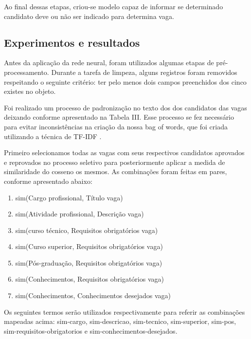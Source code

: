 \documentclass[conference]{IEEEtran}
\begin{document}
Ao final dessas etapas, criou-se modelo capaz de informar se determinado candidato deve ou não ser indicado para determina vaga.

\subsection{Experimentos e resultados}

    Antes da aplicação da rede neural, foram utilizados algumas etapas de pré-processamento. 
    Durante a tarefa de limpeza, alguns registros foram removidos respeitando o seguinte critério: ter pelo menos dois campos preenchidos dos cinco existes no objeto.
    
    Foi realizado um processo de padronização no texto dos dos candidatos das vagas deixando conforme apresentado na Tabela III. Esse processo se fez necessário para evitar inconsistências na criação da nossa bag of words, que foi criada utilizando a técnica de TF-IDF \cite{tfidf3}.
    
    Primeiro selecionamos todas as vagas com seus respectivos candidatos aprovados e reprovados no processo seletivo para posteriormente aplicar a medida de similaridade do cosseno os mesmos. As combinações foram feitas em pares, conforme apresentado abaixo:
    
    \begin{enumerate}
    \item sim(Cargo profissional, Título vaga)
    \item sim(Atividade profissional, Descrição vaga)
    \item sim(curso técnico, Requisitos obrigatórios vaga)
    \item sim(Curso superior, Requisitos obrigatórios vaga)
    \item sim(Pós-graduação, Requisitos obrigatórios vaga)
    \item sim(Conhecimentos, Requisitos obrigatórios vaga)
    \item sim(Conhecimentos, Conhecimentos desejados vaga)
    \end{enumerate}

 Os seguintes termos serão utilizados respectivamente para referir as combinações mapeadas acima: sim-cargo, sim-descricao, sim-tecnico, sim-superior, sim-pos, sim-requisitos-obrigatorios e sim-conhecimentos-desejados.
    
\end{document}
